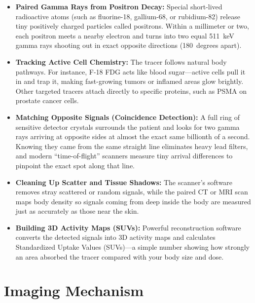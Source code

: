 \begin{itemize}
    \item \textbf{Paired Gamma Rays from Positron Decay:} Special short-lived radioactive atoms (such as fluorine-18, gallium-68, or rubidium-82) release tiny positively charged particles called positrons. Within a millimeter or two, each positron meets a nearby electron and turns into two equal 511~keV gamma rays shooting out in exact opposite directions (180~degrees apart).
    \item \textbf{Tracking Active Cell Chemistry:} The tracer follows natural body pathways. For instance, F-18 FDG acts like blood sugar---active cells pull it in and trap it, making fast-growing tumors or inflamed areas glow brightly. Other targeted tracers attach directly to specific proteins, such as PSMA on prostate cancer cells.
    \item \textbf{Matching Opposite Signals (Coincidence Detection):} A full ring of sensitive detector crystals surrounds the patient and looks for two gamma rays arriving at opposite sides at almost the exact same billionth of a second. Knowing they came from the same straight line eliminates heavy lead filters, and modern ``time-of-flight'' scanners measure tiny arrival differences to pinpoint the exact spot along that line.
    \item \textbf{Cleaning Up Scatter and Tissue Shadows:} The scanner's software removes stray scattered or random signals, while the paired CT or MRI scan maps body density so signals coming from deep inside the body are measured just as accurately as those near the skin.
    \item \textbf{Building 3D Activity Maps (SUVs):} Powerful reconstruction software converts the detected signals into 3D activity maps and calculates Standardized Uptake Values (SUVs)---a simple number showing how strongly an area absorbed the tracer compared with your body size and dose.
\end{itemize}

\section{Imaging Mechanism}

